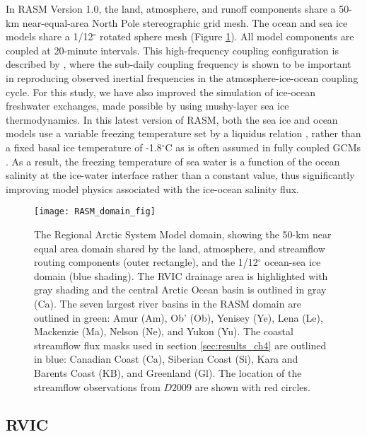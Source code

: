 In RASM Version 1.0, the land, atmosphere, and runoff components share a 50-km near-equal-area North Pole stereographic grid mesh.
The ocean and sea ice models share a 1/12$^{\circ}$ rotated sphere mesh (Figure \ref{fig:rasm_domain}).
All model components are coupled at 20-minute intervals.
This high-frequency coupling configuration is described by \citet{Roberts_2015a}, where the sub-daily coupling frequency is shown to be important in reproducing observed inertial frequencies in the atmosphere-ice-ocean coupling cycle.
For this study, we have also improved the simulation of ice-ocean freshwater exchanges, made possible by using mushy-layer sea ice thermodynamics.
In this latest version of RASM, both the sea ice and ocean models use a variable freezing temperature set by a liquidus relation \citep{Turner2015}, rather than a fixed basal ice temperature of -1.8$^\circ$C as is often assumed in fully coupled GCMs \citep [e.g.,][]{Jahn2012a}.
As a result, the freezing temperature of sea water is a function of the ocean salinity at the ice-water interface rather than a constant value, thus significantly improving model physics associated with the ice-ocean salinity flux.

\begin{figure}
    \centering
    \texttt{[image: RASM\_domain\_fig]}
    \caption{The Regional Arctic System Model domain, showing the 50-km near equal area domain shared by the land, atmosphere, and streamflow routing components (outer rectangle), and the 1/12$^\circ$ ocean-sea ice domain (blue shading).
    The RVIC drainage area is highlighted with gray shading and the central Arctic Ocean basin is outlined in gray (Ca).
    The seven largest river basins in the RASM domain are outlined in green: Amur (Am), Ob' (Ob), Yenisey (Ye), Lena (Le), Mackenzie (Ma), Nelson (Ne), and Yukon (Yu).
    The coastal streamflow flux masks used in section \ref{sec:results_ch4} are outlined in blue: Canadian Coast (Ca), Siberian Coast (Si), Kara and Barents Coast (KB), and Greenland (Gl).
    The location of the streamflow observations from $D2009$ are shown with red circles.}
    \label{fig:rasm_domain}
\end{figure}

\subsection{RVIC}
\label{sec:rvic}

